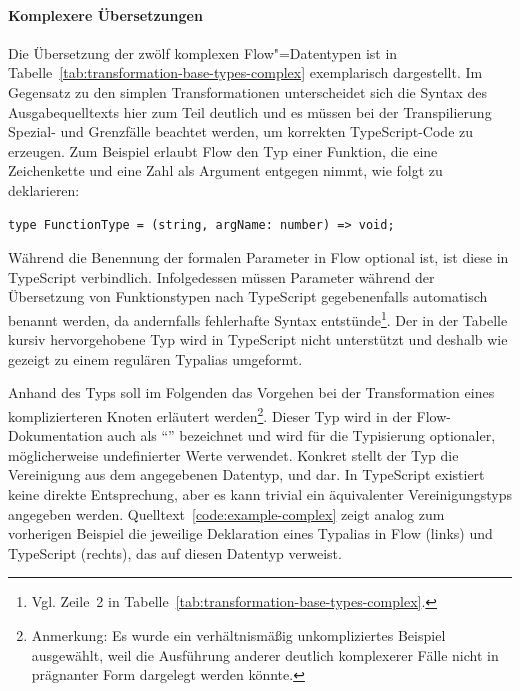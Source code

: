 {\paragraph{Komplexere Übersetzungen}

Die Übersetzung der zwölf komplexen Flow"=Datentypen ist in Tabelle~\ref{tab:transformation-base-types-complex} exemplarisch dargestellt. Im Gegensatz zu den simplen Transformationen unterscheidet sich die Syntax des Ausgabequelltexts hier zum Teil deutlich und es müssen bei der Transpilierung Spezial- und Grenzfälle beachtet werden, um korrekten TypeScript-Code zu erzeugen. Zum Beispiel erlaubt Flow den Typ einer Funktion, die eine Zeichenkette und eine Zahl als Argument entgegen nimmt, wie folgt zu deklarieren:

\begin{lstlisting}[numbers=none]
type FunctionType = (string, argName: number) => void;
\end{lstlisting}

Während die Benennung der formalen Parameter in Flow optional ist, ist diese in TypeScript verbindlich. Infolgedessen müssen Parameter während der Übersetzung von Funktionstypen nach TypeScript gegebenenfalls automatisch benannt werden, da andernfalls fehlerhafte Syntax entstünde\footnote{Vgl. Zeile~2 in Tabelle~\ref{tab:transformation-base-types-complex}.}.
Der in der Tabelle kursiv hervorgehobene Typ  wird in TypeScript nicht unterstützt und deshalb wie gezeigt zu einem regulären Typalias umgeformt.

\medbreak


Anhand des Typs  soll im Folgenden das Vorgehen bei der Transformation eines komplizierteren Knoten erläutert werden\footnote{Anmerkung: Es wurde ein verhältnismäßig unkompliziertes Beispiel ausgewählt, weil die Ausführung anderer deutlich komplexerer Fälle nicht in prägnanter Form dargelegt werden könnte.}. Dieser Typ wird in der Flow-Dokumentation auch als \enquote{} bezeichnet und wird für die Typisierung optionaler, möglicherweise undefinierter Werte verwendet\autocite{FLOW:MAYBE_TYPES}. Konkret stellt der Typ die Vereinigung aus dem angegebenen Datentyp,  und  dar. In TypeScript existiert keine direkte Entsprechung, aber es kann trivial ein äquivalenter Vereinigungstyps angegeben werden. Quelltext~\ref{code:example-complex} zeigt analog zum vorherigen Beispiel die jeweilige Deklaration eines Typalias in Flow (links) und TypeScript (rechts), das auf diesen Datentyp verweist.

}
